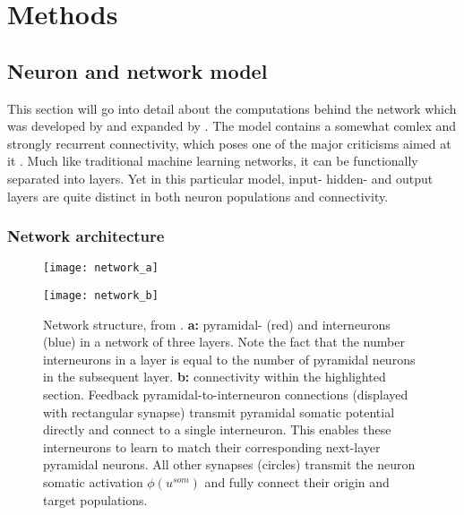 
\chapter{Methods}




\section{Neuron and network model}

This section will go into detail about the computations behind the network which was developed by
\cite{sacramento2018dendritic} and expanded by \cite{Haider2021}. The model contains a somewhat comlex and strongly
recurrent connectivity, which poses one of the major criticisms aimed at it \citep{whittington2019theories}. Much like
traditional machine learning networks, it can be functionally separated into layers. Yet in this particular model,
input- hidden- and output layers are quite distinct in both neuron populations and connectivity.


\subsection{Network architecture}

\begin{figure}[t]
  \centering
  \begin{minipage}{0.5\textwidth}
    \centering
    \texttt{[image: network\_a]}
  \end{minipage}\hfill
  \begin{minipage}{0.4\textwidth}
    \centering
    \texttt{[image: network\_b]}
  \end{minipage}
  \caption{Network structure, from \cite{Haider2021}. \textbf{a:} pyramidal- (red) and interneurons (blue) in a network
    of three layers. Note the fact that the number interneurons in a layer is equal to the number of pyramidal neurons
    in the subsequent layer\protect\footnotemark. \textbf{b:} connectivity within the highlighted section. Feedback
    pyramidal-to-interneuron connections (displayed with rectangular synapse) transmit pyramidal somatic potential
    directly and connect to a single interneuron. This enables these interneurons to learn to match their corresponding
    next-layer pyramidal neurons. All other synapses (circles) transmit the neuron somatic activation $\phi (u^{som})$
    and fully connect their origin and target populations.}
  \label{fig-network}
\end{figure}

